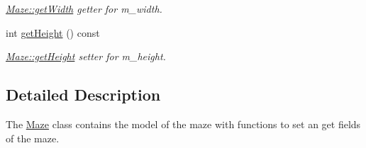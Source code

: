 \begin{DoxyCompactItemize}
\begin{DoxyCompactList}\small\item\em \hyperlink{class_maze_a55deabec3636694a2658ff902fe83a9b}{Maze\-::get\-Width} getter for m\-\_\-width. \end{DoxyCompactList}\item 
int \hyperlink{class_maze_a3cfe8e5f193ff2ed9d6915c8841d376a}{get\-Height} () const 
\begin{DoxyCompactList}\small\item\em \hyperlink{class_maze_a3cfe8e5f193ff2ed9d6915c8841d376a}{Maze\-::get\-Height} setter for m\-\_\-height. \end{DoxyCompactList}\end{DoxyCompactItemize}


\subsection{Detailed Description}
The \hyperlink{class_maze}{Maze} class contains the model of the maze with functions to set an get fields of the maze. 

